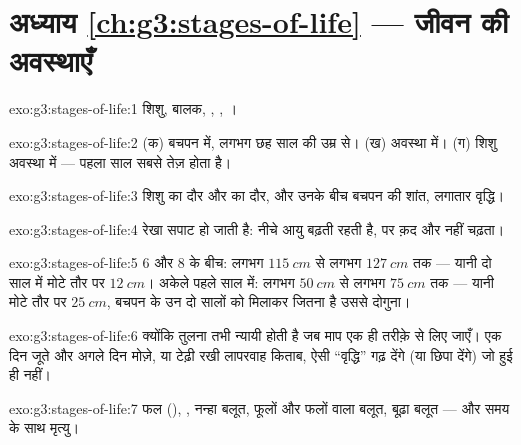 \section*{अध्याय \ref{ch:g3:stages-of-life} --- जीवन की अवस्थाएँ}

\begin{solution}{exo:g3:stages-of-life:1}
शिशु, बालक, , , ।
\end{solution}

\begin{solution}{exo:g3:stages-of-life:2}
(क) बचपन में, लगभग छह साल की उम्र से। (ख)  अवस्था में। (ग) शिशु
अवस्था में --- पहला साल सबसे तेज़ होता है।
\end{solution}

\begin{solution}{exo:g3:stages-of-life:3}
शिशु का दौर और  का दौर, और उनके बीच बचपन की शांत, लगातार वृद्धि।
\end{solution}

\begin{solution}{exo:g3:stages-of-life:4}
रेखा सपाट हो जाती है: नीचे आयु बढ़ती रहती है, पर क़द और नहीं चढ़ता।
\end{solution}

\begin{solution}{exo:g3:stages-of-life:5}
$6$ और $8$ के बीच: लगभग $\qty{115}{cm}$ से लगभग $\qty{127}{cm}$ तक
--- यानी दो साल में मोटे तौर पर $\qty{12}{cm}$। अकेले पहले साल में:
लगभग $\qty{50}{cm}$ से लगभग $\qty{75}{cm}$ तक --- यानी मोटे तौर पर
$\qty{25}{cm}$, बचपन के उन दो सालों को मिलाकर जितना है उससे दोगुना।
\end{solution}

\begin{solution}{exo:g3:stages-of-life:6}
क्योंकि तुलना तभी न्यायी होती है जब माप एक ही तरीक़े से लिए जाएँ। एक
दिन जूते और अगले दिन मोज़े, या टेढ़ी रखी लापरवाह किताब, ऐसी ``वृद्धि''
गढ़ देंगे (या छिपा देंगे) जो हुई ही नहीं।
\end{solution}

\begin{solution}{exo:g3:stages-of-life:7}
फल (), , नन्हा बलूत, फूलों और फलों वाला  बलूत, बूढ़ा
बलूत --- और समय के साथ मृत्यु।
\end{solution}

